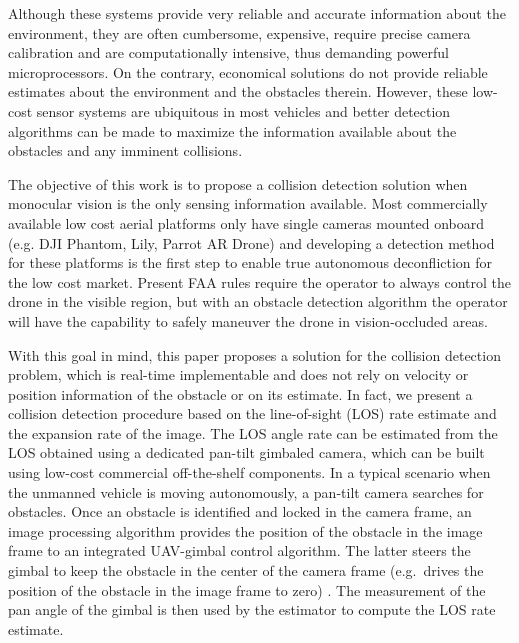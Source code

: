 \documentclass[]{aiaa-tc}%
\begin{document}
Although these systems provide very reliable and accurate information about the environment, they are often cumbersome, expensive, require precise camera calibration and are computationally intensive, thus demanding powerful microprocessors. On the contrary, economical solutions do not provide reliable estimates about the environment and the obstacles therein. However, these low-cost sensor systems are ubiquitous in most vehicles and better detection algorithms can be made to maximize the information available about the obstacles and any imminent collisions.

The objective of this work is to propose a collision detection solution when monocular vision is the only sensing information available. Most commercially available low cost aerial platforms only have single cameras mounted onboard (e.g. DJI Phantom, Lily, Parrot AR Drone) and developing a detection method for these platforms is the first step to enable true autonomous deconfliction for the low cost market. Present FAA rules require the operator to always control the drone in the visible region, but with an obstacle detection algorithm the operator will have the capability to safely maneuver the drone in vision-occluded areas.


With this goal in mind, this paper proposes a solution for the collision detection problem, which is real-time implementable and does not rely on velocity or position information of the obstacle or on its estimate. In fact, we present a collision detection procedure based on the line-of-sight (LOS) rate estimate and the expansion rate of the image. The LOS angle rate can be estimated from the LOS obtained using a dedicated pan-tilt gimbaled camera, which can be built using low-cost commercial off-the-shelf components. In a typical scenario when the unmanned vehicle is moving autonomously, a pan-tilt camera searches for obstacles. Once an obstacle is identified and locked in the camera frame, an image processing algorithm \cite{PerceptiVU} provides the position of the obstacle in the image frame to an integrated UAV-gimbal control algorithm. The latter steers the gimbal to keep the obstacle in the center of the camera frame (e.g.\ drives the position of the obstacle in the image frame to zero) \cite{dobrokhodov2008vision}. The measurement of the  pan angle of the gimbal is then used by the estimator to compute the LOS rate estimate.
\end{document}
